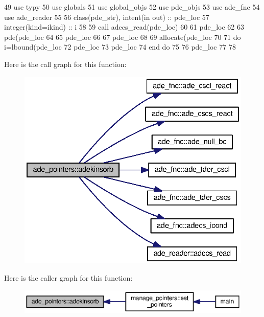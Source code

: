 \begin{DoxyCode}
49       \textcolor{keywordtype}{use }typy
50       \textcolor{keywordtype}{use }globals
51       \textcolor{keywordtype}{use }global_objs
52       \textcolor{keywordtype}{use }pde_objs
53       \textcolor{keywordtype}{use }ade_fnc
54       \textcolor{keywordtype}{use }ade_reader
55       
56       \textcolor{keywordtype}{class}(pde_str), \textcolor{keywordtype}{intent(in out)} :: pde\_loc  
57       \textcolor{keywordtype}{integer(kind=ikind)} :: i
58       
59       \textcolor{keyword}{call }adecs_read(pde\_loc)
60       
61       pde\_loc%
62       
63       pde(pde\_loc%
64       
65       pde\_loc%
66       
67       pde\_loc%
68       
69       \textcolor{keyword}{allocate}(pde\_loc%
70 \textcolor{comment}{      }
71 \textcolor{comment}{      }\textcolor{keywordflow}{do} i=lbound(pde\_loc%
72         pde\_loc%
73         pde\_loc%
74 \textcolor{keywordflow}{      end do} 
75       
76       pde\_loc%
77       
78     
\end{DoxyCode}


Here is the call graph for this function\+:\nopagebreak
\begin{figure}[H]
\begin{center}
\leavevmode
\includegraphics[width=331pt]{namespaceade__pointers_aa2bb46d0195e5bf43f5bc8066b07b803_cgraph}
\end{center}
\end{figure}




Here is the caller graph for this function\+:\nopagebreak
\begin{figure}[H]
\begin{center}
\leavevmode
\includegraphics[width=350pt]{namespaceade__pointers_aa2bb46d0195e5bf43f5bc8066b07b803_icgraph}
\end{center}
\end{figure}


